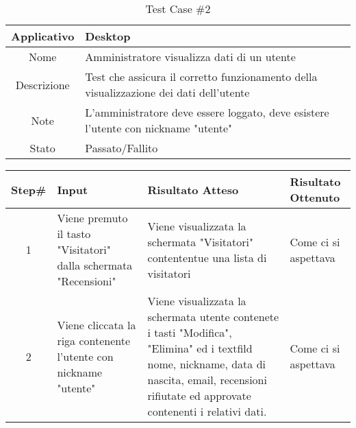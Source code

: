 
\begin{table}[H]
    \footnotesize
    \caption{Test Case \#2}
    \begin{tabularx}{\textwidth}{|c|X|}
        \hline
        Applicativo & Desktop\\
        \hline
        Nome & Amministratore visualizza dati di un utente  \\
        \hline
        Descrizione & Test che assicura il corretto funzionamento della visualizzazione dei dati dell'utente\\
        \hline
        Note & L'amministratore deve essere loggato, deve esistere l'utente con nickname "utente" \\
        \hline
        Stato & Passato/Fallito\\
        \hline

    \end{tabularx}
    \setlength{\tabcolsep}{8pt}
    \renewcommand{\arraystretch}{1.5}
\end{table}

\begin{table}[H]
    \footnotesize
    \begin{tabularx}{\textwidth}{|c|X|X|X|}
        \hline
        Step\# & Input & Risultato Atteso & Risultato Ottenuto \\
        \hline
         1 & Viene premuto il tasto "Visitatori" dalla schermata "Recensioni" 
         & Viene visualizzata la schermata "Visitatori" contententue una lista di visitatori
         &Come ci si aspettava \\
          \hline
        2 & Viene cliccata la riga contenente l'utente con nickname "utente"
        & Viene visualizzata la schermata utente contenete i tasti "Modifica", "Elimina" ed i textfild nome, nickname, data di nascita, email, recensioni rifiutate ed approvate contenenti i relativi dati.
        & Come ci si aspettava\\
         \hline  
    \end{tabularx}
\end{table}
    
       
